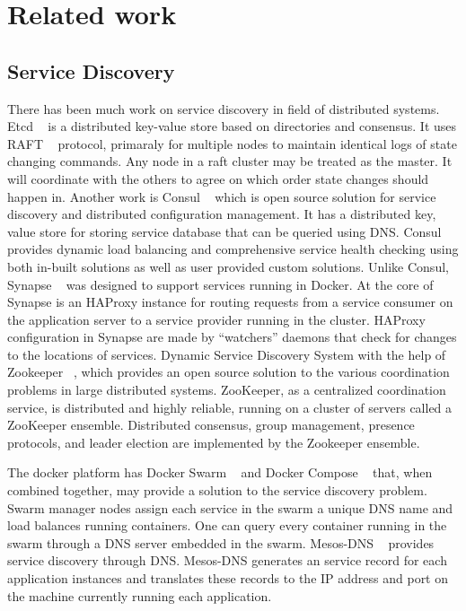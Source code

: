 \section{Related work}
\label{related}

\subsection{Service Discovery}

There has been much work on service discovery in field of distributed systems. Etcd ~\cite{etcd} is a distributed key-value store based on directories and consensus. It uses RAFT ~\cite{raft} protocol, primaraly for multiple nodes to maintain identical logs of state changing commands. Any node in a raft cluster may be treated as the master. It will coordinate with the others to agree on which order state changes should happen in. Another work is Consul ~\cite{Consul} which is open source solution for service discovery and distributed configuration management. It has a distributed key, value store for storing service database that can be queried using DNS. Consul provides dynamic load balancing and comprehensive service health checking using both in-built solutions as well as user provided custom solutions. Unlike Consul, Synapse ~\cite{Synapse} was designed to support services running in Docker. At the core of Synapse is an HAProxy instance for routing requests from a service consumer on the application server to a service provider running in the cluster. HAProxy configuration in Synapse are made by “watchers” daemons that check for changes to the locations of services. Dynamic Service Discovery System with the help of Zookeeper ~\cite{zookeeper}, which provides an open source solution to the various coordination problems in large distributed systems.  ZooKeeper, as a centralized coordination service, is distributed and highly reliable, running on a cluster of servers called a ZooKeeper ensemble. Distributed consensus, group management, presence protocols, and leader election are implemented by the Zookeeper ensemble. 

The docker platform has Docker Swarm ~\cite{swarm} and Docker Compose ~\cite{compose} that, when combined together, may provide a solution to the service discovery problem. Swarm manager nodes assign each service in the swarm a unique DNS name and load balances running containers. One can query every container running in the swarm through a DNS server embedded in the swarm. Mesos-DNS ~\cite{mesos} provides service discovery through DNS. Mesos-DNS generates an service record for each application instances and translates these records to the IP address and port on the machine currently running each application.

